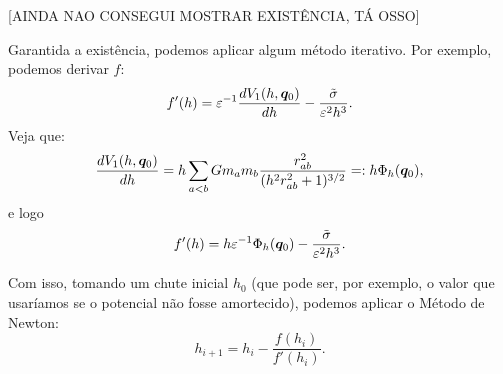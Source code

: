 [AINDA NAO CONSEGUI MOSTRAR EXISTÊNCIA, TÁ OSSO]

Garantida a existência, podemos aplicar algum método iterativo. Por exemplo, podemos derivar $f$:
\begin{equation}
    f'(h) = \varepsilon^{-1} \dfrac{d V_1 (h, \bm q_0)}{d h} - \dfrac{\tilde \sigma}{\varepsilon^2 h^3}.
\end{equation}
Veja que:
\begin{equation}
    \dfrac{d V_1(h, \bm q_0)}{d h} = h \sum_{a < b} G m_a m_b \dfrac{r_{ab}^2}{(h^2 r_{ab}^2 + 1)^{3/2}} =: h \Phi_h(\bm q_0),
\end{equation}
e logo
\begin{equation}
    f'(h) = h \varepsilon^{-1} \Phi_h(\bm q_0) - \dfrac{\tilde \sigma}{\varepsilon^2 h^3}.
\end{equation}

Com isso, tomando um chute inicial $h_0$ (que pode ser, por exemplo, o valor que usaríamos se o potencial não fosse amortecido), podemos aplicar o Método de Newton:
\begin{equation}
    h_{i+1} = h_i - \dfrac{f(h_i)}{f'(h_i)}.
\end{equation}